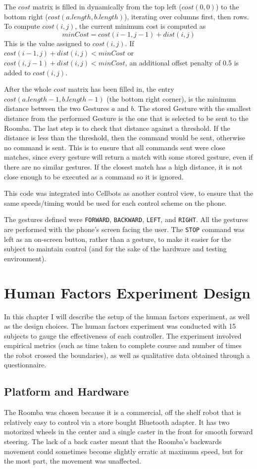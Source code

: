 \documentclass[12pt,a4paper]{report}
\begin{document}
The $cost$ matrix is filled in dynamically from the top left ($cost(0, 0)$) to the bottom right ($cost(a.length, b.length)$), iterating over columns first, then rows. To compute $cost(i, j)$, the current minimum cost is computed as \[minCost = cost(i - 1, j - 1) + dist(i, j)\] This is the value assigned to $cost(i, j)$. If $cost(i - 1, j) + dist(i, j) < minCost$ or $cost(i, j - 1) + dist(i, j) < minCost$, an additional offset penalty of 0.5 is added to $cost(i, j)$.

After the whole $cost$ matrix has been filled in, the entry $cost(a.length - 1, b.length - 1)$ (the bottom right corner), is the minimum distance between the two Gestures $a$ and $b$. The stored Gesture with the smallest distance from the performed Gesture is the one that is selected to be sent to the Roomba. The last step is to check that distance against a threshold. If the distance is less than the threshold, then the command would be sent, otherwise no command is sent. This is to ensure that all commands sent were close matches, since every gesture will return a match with some stored gesture, even if there are no similar gestures. If the closest match has a high distance, it is not close enough to be executed as a command so it is ignored.

This code was integrated into Cellbots as another control view, to ensure that the same speeds/timing would be used for each control scheme on the phone.

The gestures defined were \texttt{FORWARD}, \texttt{BACKWARD}, \texttt{LEFT}, and \texttt{RIGHT}. 
All the gestures are performed with the phone's screen facing the user. The \texttt{STOP} command was left as an on-screen button, rather than a gesture, to make it easier for the subject to maintain control (and for the sake of the hardware and testing environment).

\chapter{Human Factors Experiment Design}
In this chapter I will describe the setup of the human factors experiment, as well as the design choices. The human factors experiment was conducted with 15 subjects to gauge the effectiveness of each controller. The experiment involved empirical metrics (such as time taken to complete course and number of times the robot crossed the boundaries), as well as qualitative data obtained through a questionnaire.
\section{Platform and Hardware}
The Roomba was chosen because it is a commercial, off the shelf robot that is relatively easy to control via a store bought Bluetooth adapter. It has two motorized wheels in the center and a single caster in the front for smooth forward steering. The lack of a back caster meant that the Roomba's backwards movement could sometimes become slightly erratic at maximum speed, but for the most part, the movement was unaffected.
\end{document}

